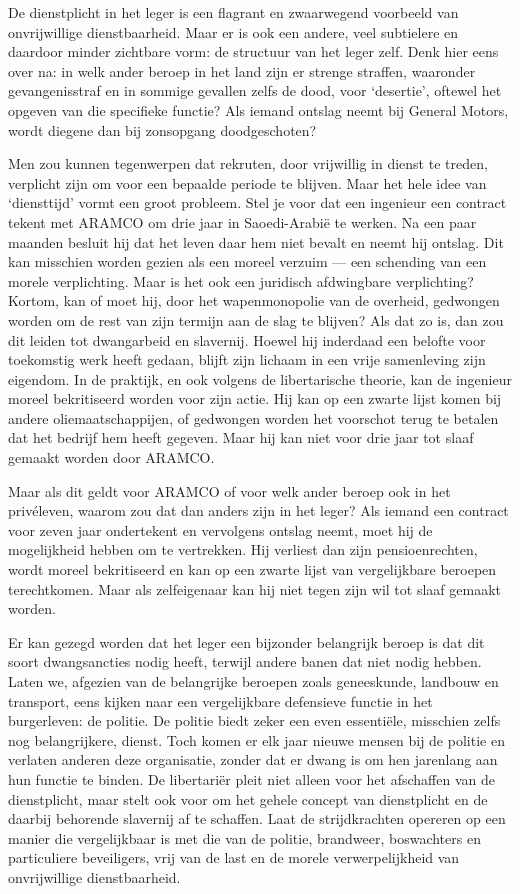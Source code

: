 \documentclass[
  a5paper,
  smalldemyvopaper,10pt,twoside,onecolumn,openright,extrafontsizes,hidelinks]{memoir}
\begin{document}
De dienstplicht in het leger is een flagrant en zwaarwegend voorbeeld
van onvrijwillige dienstbaarheid. Maar er is ook een andere, veel
subtielere en daardoor minder zichtbare vorm: de structuur van het leger
zelf. Denk hier eens over na: in welk ander beroep in het land zijn er
strenge straffen, waaronder gevangenisstraf en in sommige gevallen zelfs
de dood, voor `desertie', oftewel het opgeven van die specifieke
functie? Als iemand ontslag neemt bij General Motors, wordt diegene dan
bij zonsopgang doodgeschoten?

Men zou kunnen tegenwerpen dat rekruten, door vrijwillig in dienst te
treden, verplicht zijn om voor een bepaalde periode te blijven. Maar het
hele idee van `diensttijd' vormt een groot probleem. Stel je voor dat
een ingenieur een contract tekent met ARAMCO om drie jaar in
Saoedi-Arabië te werken. Na een paar maanden besluit hij dat het leven
daar hem niet bevalt en neemt hij ontslag. Dit kan misschien worden
gezien als een moreel verzuim --- een schending van een morele
verplichting. Maar is het ook een juridisch afdwingbare verplichting?
Kortom, kan of moet hij, door het wapenmonopolie van de overheid,
gedwongen worden om de rest van zijn termijn aan de slag te blijven? Als
dat zo is, dan zou dit leiden tot dwangarbeid en slavernij. Hoewel hij
inderdaad een belofte voor toekomstig werk heeft gedaan, blijft zijn
lichaam in een vrije samenleving zijn eigendom. In de praktijk, en ook
volgens de libertarische theorie, kan de ingenieur moreel bekritiseerd
worden voor zijn actie. Hij kan op een zwarte lijst komen bij andere
oliemaatschappijen, of gedwongen worden het voorschot terug te betalen
dat het bedrijf hem heeft gegeven. Maar hij kan niet voor drie jaar tot
slaaf gemaakt worden door ARAMCO.

Maar als dit geldt voor ARAMCO of voor welk ander beroep ook in het
privéleven, waarom zou dat dan anders zijn in het leger? Als iemand een
contract voor zeven jaar ondertekent en vervolgens ontslag neemt, moet
hij de mogelijkheid hebben om te vertrekken. Hij verliest dan zijn
pensioenrechten, wordt moreel bekritiseerd en kan op een zwarte lijst
van vergelijkbare beroepen terechtkomen. Maar als zelfeigenaar kan hij
niet tegen zijn wil tot slaaf gemaakt worden.

Er kan gezegd worden dat het leger een bijzonder belangrijk beroep is
dat dit soort dwangsancties nodig heeft, terwijl andere banen dat niet
nodig hebben. Laten we, afgezien van de belangrijke beroepen zoals
geneeskunde, landbouw en transport, eens kijken naar een vergelijkbare
defensieve functie in het burgerleven: de politie. De politie biedt
zeker een even essentiële, misschien zelfs nog belangrijkere, dienst.
Toch komen er elk jaar nieuwe mensen bij de politie en verlaten anderen
deze organisatie, zonder dat er dwang is om hen jarenlang aan hun
functie te binden. De libertariër pleit niet alleen voor het afschaffen
van de dienstplicht, maar stelt ook voor om het gehele concept van
dienstplicht en de daarbij behorende slavernij af te schaffen. Laat de
strijdkrachten opereren op een manier die vergelijkbaar is met die van
de politie, brandweer, boswachters en particuliere beveiligers, vrij van
de last en de morele verwerpelijkheid van onvrijwillige dienstbaarheid.
\end{document}
